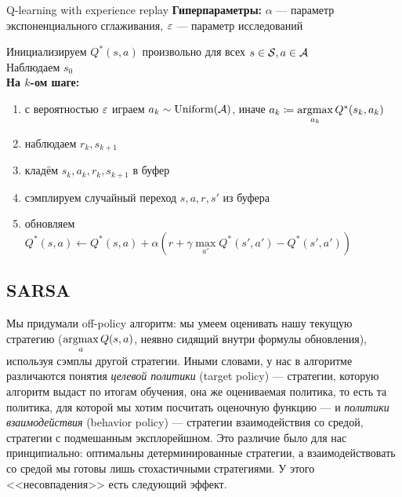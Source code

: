 \begin{algorithm}{Q-learning with experience replay}
\textbf{Гиперпараметры:} $\alpha$ --- параметр экспоненциального сглаживания, $\varepsilon$ --- параметр исследований

\vspace{0.3cm}
Инициализируем $Q^*(s, a)$ произвольно для всех $s \in \mathcal{S}, a \in \mathcal{A}$ \\
Наблюдаем $s_0$ \\ 
\textbf{На $k$-ом шаге:}
\begin{enumerate}
    \item с вероятностью $\varepsilon$ играем $a_k \sim \operatorname{Uniform}(\mathcal{A})$, иначе $a_k \coloneqq \mathop{\mathrm{argmax}}\limits_{a_k} Q^*(s_k, a_k)$
    \item наблюдаем $r_k, s_{k+1}$
    \item кладём $s_k, a_k, r_k, s_{k+1}$ в буфер
    \item сэмплируем случайный переход $s, a, r, s'$ из буфера
    \item обновляем $Q^*(s, a) \leftarrow Q^*(s, a) + \alpha \left( r + \gamma \max\limits_{a'} Q^*(s', a') - Q^*(s', a') \right)$
\end{enumerate}
\end{algorithm}

\subsection{SARSA}\label{subsec:sarsa}

Мы придумали off-policy алгоритм: мы умеем оценивать нашу текущую стратегию ($\mathop{\mathrm{argmax}}\limits_a Q(s, a)$, неявно сидящий внутри формулы обновления), используя сэмплы другой стратегии. Иными словами, у нас в алгоритме различаются понятия \emph{целевой политики} (target policy) --- стратегии, которую алгоритм выдаст по итогам обучения, она же оцениваемая политика, то есть та политика, для которой мы хотим посчитать оценочную функцию --- и \emph{политики взаимодействия} (behavior policy) --- стратегии взаимодействия со средой, стратегии с подмешанным эксплорейшном. Это различие было для нас принципиально: оптимальны детерминированные стратегии, а взаимодействовать со средой мы готовы лишь стохастичными стратегиями. У этого <<несовпадения>> есть следующий эффект.

